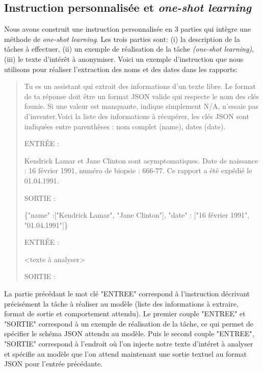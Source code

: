 \subsection{Instruction personnalisée et \textit{one-shot learning}}
Nous avons construit une instruction personnalisée en 3 parties qui intègre une méthode de \textit{one-shot learning}. Les trois parties sont: (i) la description de la tâches à effectuer, (ii) un exemple de réalisation de la tâche \textit{(one-shot learning)}, (iii) le texte d'intérêt à anonymiser.
Voici un exemple d'instruction que nous utilisons pour réaliser l'extraction des noms et des dates dans les rapports:
\begin{quote}
Tu es un assistant qui extrait des informations d'un texte libre. Le format de ta réponse doit être un format JSON valide qui respecte le nom des clés founie. Si une valeur est manquante, indique simplement N/A, n'essaie pas d'inventer.Voici la liste des informations à récupérer, les clés JSON sont indiquées entre parenthèses : nom complet (name), dates (date).

ENTRÉE :

Kendrick Lamar et Jane Clinton sont asymptomatiques. Date de naissance : 16 février 1991, numéro de biopsie : 666-77. Ce rapport a été expédié le 01.04.1991.

SORTIE :

\{"name" :["Kendrick Lamar", "Jane Clinton"], "date" : ["16 février 1991", "01.04.1991"]\}

ENTRÉE :

<texte à analyser>

SORTIE :
\end{quote}

La partie précédant le mot clé "ENTREE" correspond à l'instruction décrivant précisément la tâche à réaliser au modèle (liste des informations à extraire, format de sortie et comportement attendu). Le premier couple "ENTREE" et "SORTIE" correspond à un exemple de réalisation de la tâche, ce qui permet de spécifier le schéma JSON attendu au modèle. Puis le second couple "ENTREE", "SORTIE" correspond à l'endroit où l'on injecte notre texte d'intéret à analyser et spécifie au modèle que l'on attend maintenant une sortie textuel au format JSON pour l'entrée précédante.
